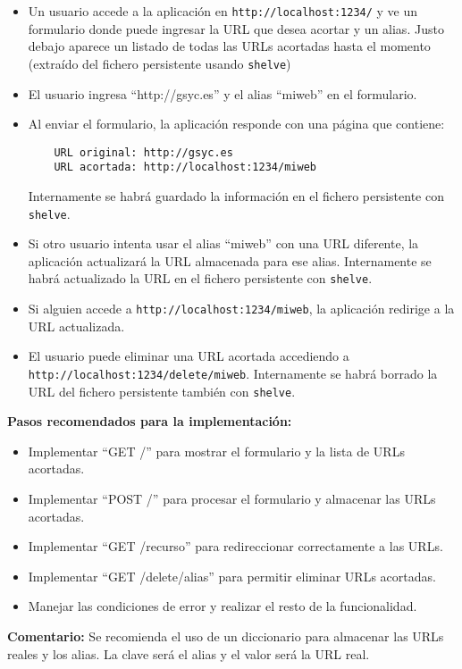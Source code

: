 \begin{itemize}
    \item Un usuario accede a la aplicación en \texttt{http://localhost:1234/} y ve un formulario donde puede ingresar la URL que desea acortar y un alias. Justo debajo aparece un listado de todas las URLs acortadas hasta el momento (extraído del fichero persistente usando \texttt{shelve})
    \item El usuario ingresa ``http://gsyc.es'' y el alias ``miweb'' en el formulario.
    \item Al enviar el formulario, la aplicación responde con una página que contiene:
    \begin{verbatim}
    URL original: http://gsyc.es
    URL acortada: http://localhost:1234/miweb
    \end{verbatim}
    Internamente se habrá guardado la información en el fichero persistente con \texttt{shelve}.
    \item Si otro usuario intenta usar el alias ``miweb'' con una URL diferente, la aplicación actualizará la URL almacenada para ese alias. Internamente se habrá actualizado la URL en el fichero persistente con \texttt{shelve}.
    \item Si alguien accede a \texttt{http://localhost:1234/miweb}, la aplicación redirige a la URL actualizada.
    \item El usuario puede eliminar una URL acortada accediendo a \texttt{http://localhost:1234/delete/miweb}. Internamente se habrá borrado la URL del fichero persistente también con \texttt{shelve}.
\end{itemize}

\textbf{Pasos recomendados para la implementación:}

\begin{itemize}
    \item Implementar ``GET /'' para mostrar el formulario y la lista de URLs acortadas.
    \item Implementar ``POST /'' para procesar el formulario y almacenar las URLs acortadas.
    \item Implementar ``GET /recurso'' para redireccionar correctamente a las URLs.
    \item Implementar ``GET /delete/alias'' para permitir eliminar URLs acortadas.
    \item Manejar las condiciones de error y realizar el resto de la funcionalidad.
\end{itemize}

\textbf{Comentario:} Se recomienda el uso de un diccionario para almacenar las URLs reales y los alias. La clave será el alias y el valor será la URL real.

